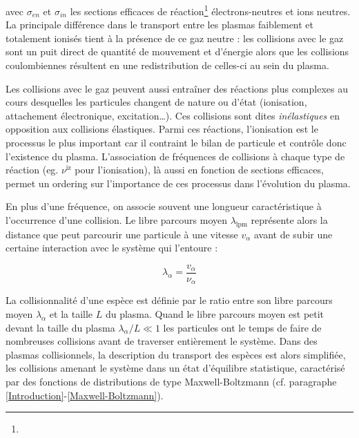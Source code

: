 \begin{refsection}
avec $\sigma_{en}$ et $\sigma_{in}$ les sections efficaces de
réaction\footnote{} électrons-neutres et ions neutres. La principale
différence dans le transport entre les plasmas faiblement et totalement ionisés tient à la
présence de ce gaz neutre : les collisions avec le gaz sont un puit
direct de quantité de mouvement et d'énergie alors que les
collisions coulombiennes résultent en une redistribution de celles-ci au sein
du plasma.

Les collisions avec le gaz peuvent aussi entraîner des réactions plus complexes
au cours desquelles les particules changent de nature ou d'état (ionisation,
attachement électronique, excitation\ldots).
Ces collisions sont dites \emph{inélastiques} en opposition aux collisions
élastiques. Parmi ces réactions, l'ionisation est le processus le plus
important car il contraint le bilan de particule et contrôle donc l'existence
du plasma. L'association de fréquences de collisions à chaque type de réaction
(eg. $\nu^\text{iz}$ pour l'ionisation), là aussi en fonction de sections
efficaces, permet un ordering sur l'importance de ces processus dans l'évolution
du plasma.

En plus d'une fréquence, on associe souvent une longueur caractéristique
à l'occurrence d'une collision. Le libre parcours moyen $\lambda_\text{lpm}$
représente alors la distance que peut parcourir une particule à une vitesse
$v_\alpha$ avant de subir une certaine interaction avec le système qui l'entoure
:

\begin{equation}
	\lambda_\alpha=\frac{v_\alpha}{\nu_\alpha}
\end{equation} 

La collisionnalité d'une espèce est
définie par le ratio entre son libre parcours moyen $\lambda_\alpha$ et la
taille $L$ du plasma. Quand le libre parcours moyen est petit devant la
taille du plasma $\lambda_\alpha/L\ll 1$
les particules ont le temps de faire de nombreuses collisions avant de
traverser entièrement le système. Dans des plasmas collisionnels, la description
du transport des espèces est alors simplifiée, les collisions amenant le système dans un état
d'équilibre statistique, caractérisé par des fonctions de distributions de
type Maxwell-Boltzmann (cf. paragraphe \ref{Introduction}-\ref{Maxwell-Boltzmann}).



\end{refsection}
